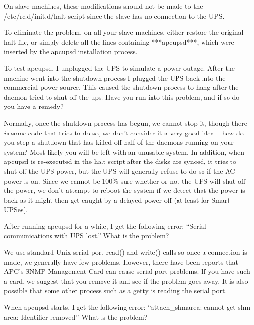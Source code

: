 {{{{{{\begin{description}
{{On slave machines, these modifications should not be made to the
/etc/rc.d/init.d/halt script since the slave has no connection to the UPS.  

To eliminate the problem, on all your slave machines, either restore the
original halt file, or simply delete all the lines containing ***apcupsd***,
which were inserted by the apcupsd installation process.  

\item [Q:]
   To test apcupsd, I unplugged the UPS to simulate a power outage. After the
machine went into the shutdown process I plugged the UPS back into the
commercial power source. This caused the shutdown process to hang after the
daemon tried to shut-off the ups. Have you run into this problem, and if so do
you have a remedy?  

\item [A:]
   Normally, once the shutdown process has begun, we cannot stop it, though there
{\it is} some code that tries to do so, we don't consider it a very good idea
{--} how do you stop a shutdown that has killed off half of the daemons
running on your system? Most likely you will be left with an unusable system.
In addition, when apcupsd is re-executed in the halt script after the disks
are synced, it tries to shut off the UPS power, but the UPS will generally
refuse to do so if the AC power is on. Since we cannot be 100\% sure whether
or not the UPS will shut off the power, we don't attempt to reboot the system
if we detect that the power is back as it might then get caught by a delayed
power off (at least for Smart UPSes).  

\item [Q:]
   After running apcupsd for a while, I get the following error: ``Serial
communications with UPS lost.'' What is the problem?  

\item [A:]
   We use standard Unix serial port read() and write() calls so once a connection
is made, we generally have few problems. However, there have been reports that
APC's SNMP Management Card can cause serial port problems. If you have such a
card, we suggest that you remove it and see if the problem goes away. It is
also possible that some other process such as a getty is reading the serial
port.  

\item [Q:]
   When apcupsd starts, I get the following error: ``attach\_shmarea: cannot get
shm area: Identifier removed.'' What is the problem?  

}}
\end{description}}}}}}}
